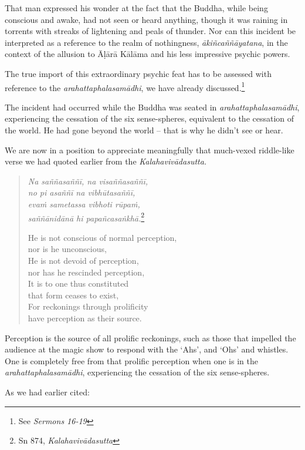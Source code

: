 That man expressed his wonder at the fact that the Buddha, while being conscious and awake, had not seen or heard anything, though it was raining in torrents with streaks of lightening and peals of thunder. Nor can this incident be interpreted as a reference to the realm of nothingness, \emph{ākiñcaññāyatana}, in the context of the allusion to Āḷārā Kālāma and his less impressive psychic powers.

The true import of this extraordinary psychic feat has to be assessed with reference to the \emph{arahattaphalasamādhi}, we have already discussed.\footnote{See \emph{Sermons 16-19}}

The incident had occurred while the Buddha was seated in \emph{arahattaphalasamādhi}, experiencing the cessation of the six sense-spheres, equivalent to the cessation of the world. He had gone beyond the world -- that is why he didn't see or hear.

We are now in a position to appreciate meaningfully that much-vexed riddle-like verse we had quoted earlier from the \emph{Kalahavivādasutta.}

\begin{quote}
\emph{Na saññasaññī, na visaññasaññī,}\\
\emph{no pi asaññī na vibhūtasaññī,}\\
\emph{evaṁ sametassa vibhoti rūpaṁ,}\\
\emph{saññānidānā hi papañcasaṅkhā.}\footnote{Sn 874, \emph{Kalahavivādasutta}}

He is not conscious of normal perception,\\
\vin nor is he unconscious,\\
He is not devoid of perception,\\
\vin nor has he rescinded perception,\\
It is to one thus constituted\\
\vin that form ceases to exist,\\
For reckonings through prolificity\\
\vin have perception as their source.
\end{quote}

Perception is the source of all prolific reckonings, such as those that impelled the audience at the magic show to respond with the `Ahs', and `Ohs' and whistles. One is completely free from that prolific perception when one is in the \emph{arahattaphalasamādhi}, experiencing the cessation of the six sense-spheres.

As we had earlier cited:

